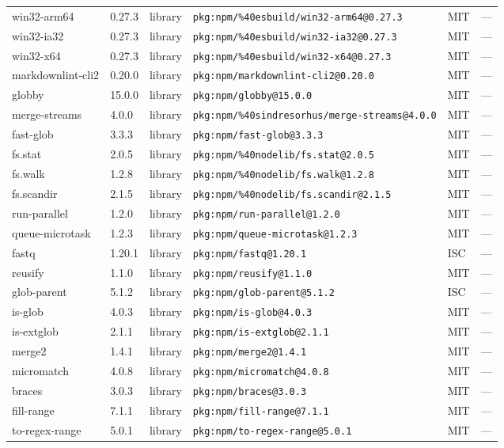 \documentclass[11pt]{article}
\begin{document}
\begin{longtable}{|l|l|l|p{2.2cm}|l|p{4cm}|}
win32-arm64 & 0.27.3 & library & \texttt{pkg:npm/\%40esbuild/win32-arm64@0.27.3} & MIT & — \\
win32-ia32 & 0.27.3 & library & \texttt{pkg:npm/\%40esbuild/win32-ia32@0.27.3} & MIT & — \\
win32-x64 & 0.27.3 & library & \texttt{pkg:npm/\%40esbuild/win32-x64@0.27.3} & MIT & — \\
markdownlint-cli2 & 0.20.0 & library & \texttt{pkg:npm/markdownlint-cli2@0.20.0} & MIT & — \\
globby & 15.0.0 & library & \texttt{pkg:npm/globby@15.0.0} & MIT & — \\
merge-streams & 4.0.0 & library & \texttt{pkg:npm/\%40sindresorhus/merge-streams@4.0.0} & MIT & — \\
fast-glob & 3.3.3 & library & \texttt{pkg:npm/fast-glob@3.3.3} & MIT & — \\
fs.stat & 2.0.5 & library & \texttt{pkg:npm/\%40nodelib/fs.stat@2.0.5} & MIT & — \\
fs.walk & 1.2.8 & library & \texttt{pkg:npm/\%40nodelib/fs.walk@1.2.8} & MIT & — \\
fs.scandir & 2.1.5 & library & \texttt{pkg:npm/\%40nodelib/fs.scandir@2.1.5} & MIT & — \\
run-parallel & 1.2.0 & library & \texttt{pkg:npm/run-parallel@1.2.0} & MIT & — \\
queue-microtask & 1.2.3 & library & \texttt{pkg:npm/queue-microtask@1.2.3} & MIT & — \\
fastq & 1.20.1 & library & \texttt{pkg:npm/fastq@1.20.1} & ISC & — \\
reusify & 1.1.0 & library & \texttt{pkg:npm/reusify@1.1.0} & MIT & — \\
glob-parent & 5.1.2 & library & \texttt{pkg:npm/glob-parent@5.1.2} & ISC & — \\
is-glob & 4.0.3 & library & \texttt{pkg:npm/is-glob@4.0.3} & MIT & — \\
is-extglob & 2.1.1 & library & \texttt{pkg:npm/is-extglob@2.1.1} & MIT & — \\
merge2 & 1.4.1 & library & \texttt{pkg:npm/merge2@1.4.1} & MIT & — \\
micromatch & 4.0.8 & library & \texttt{pkg:npm/micromatch@4.0.8} & MIT & — \\
braces & 3.0.3 & library & \texttt{pkg:npm/braces@3.0.3} & MIT & — \\
fill-range & 7.1.1 & library & \texttt{pkg:npm/fill-range@7.1.1} & MIT & — \\
to-regex-range & 5.0.1 & library & \texttt{pkg:npm/to-regex-range@5.0.1} & MIT & — \\

\end{longtable}
\end{document}
